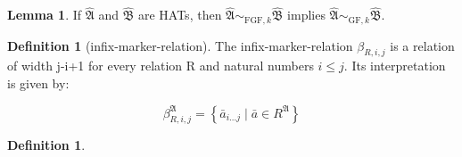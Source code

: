 \documentclass[draft]{scrartcl}
\theoremstyle{definition}
\newtheorem{definition}[theorem]{Definition}
\newtheorem{lemma}[theorem]{Lemma}
\begin{document}
\begin{lemma}
If $\mathfrak{\hat{A}}$ and $\mathfrak{\hat{B}}$ are HATs, then $\mathfrak{\hat{A}} \sim_{\mathrm{FGF},k} \mathfrak{\hat{B}}$ implies $\mathfrak{\hat{A}} \sim_{\mathrm{GF},k} \mathfrak{\hat{B}}$.
\end{lemma}

\begin{definition}[infix-marker-relation]
The infix-marker-relation $\beta_{R,i,j}$ is a relation of width j-i+1 for every relation R and natural numbers $i \leq j$.
Its interpretation is given by:

\[
  \beta_{R,i,j}^\mathfrak{A} = \left\{ \bar{a}_{i\ldots{}j} \mid \bar{a} \in R^\mathfrak{A} \right\}
\]
\end{definition}

\begin{definition}

\end{definition}
\end{document}
